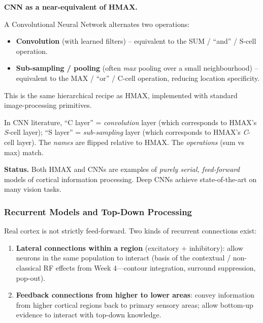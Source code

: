 \separator

\textbf{CNN as a near-equivalent of HMAX.}

\begin{defbox}
A Convolutional Neural Network alternates two operations:
\begin{itemize}
  \item \textbf{Convolution} (with learned filters) -- equivalent to the SUM / ``and'' / S-cell operation.
  \item \textbf{Sub-sampling / pooling} (often \emph{max} pooling over a small neighbourhood) -- equivalent to the MAX / ``or'' / C-cell operation, reducing location specificity.
\end{itemize}
This is the same hierarchical recipe as HMAX, implemented with standard image-processing primitives.
\end{defbox}

\begin{tipbox}
In CNN literature, ``C layer'' = \emph{convolution} layer (which corresponds to HMAX's \emph{S}-cell layer); ``S layer'' = \emph{sub-sampling} layer (which corresponds to HMAX's \emph{C}-cell layer). The \emph{names} are flipped relative to HMAX. The \emph{operations} (sum vs max) match.
\end{tipbox}

\textbf{Status.} Both HMAX and CNNs are examples of \emph{purely serial, feed-forward} models of cortical information processing. Deep CNNs achieve state-of-the-art on many vision tasks.

\bigseparator

\subsubsection{Recurrent Models and Top-Down Processing}

Real cortex is not strictly feed-forward. Two kinds of recurrent connections exist:

\begin{enumerate}
  \item \textbf{Lateral connections within a region} (excitatory + inhibitory): allow neurons in the same population to interact (basis of the contextual / non-classical RF effects from Week 4---contour integration, surround suppression, pop-out).
  \item \textbf{Feedback connections from higher to lower areas}: convey information from higher cortical regions back to primary sensory areas; allow bottom-up evidence to interact with top-down knowledge.
\end{enumerate}

